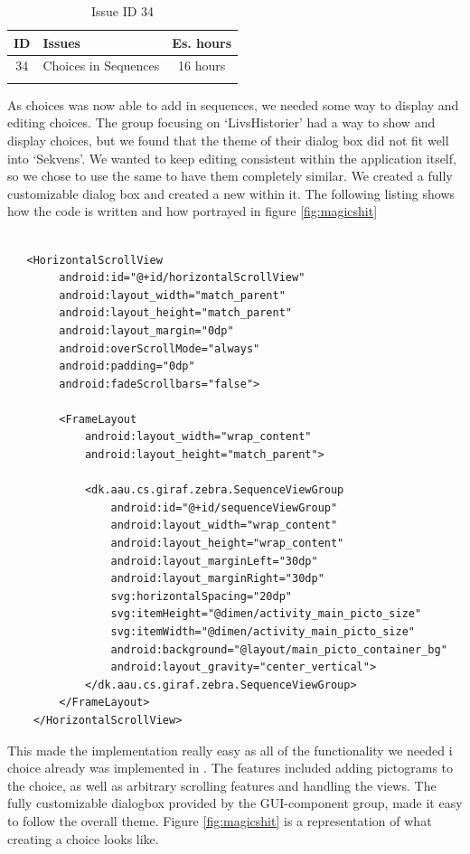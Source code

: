 \begin{longtable} { | c | p{12cm} | c | } 
\hline
	ID 	&	Issues	&		 Es. hours \\\hline
	34 	&	Choices in Sequences	&	16 hours \\\hline
\caption{Issue ID 34}
\label{tab:spr3_choicesinsequences}
\end{longtable}

As choices was now able to add in sequences, we needed some way to display and editing choices.  The group focusing on `LivsHistorier' had a way to show and display choices, but we found that the theme of their dialog box did not fit well into `Sekvens'. We wanted to keep editing consistent within the application itself, so we chose to use the same  to have them completely similar. We created a fully customizable dialog box and created a new  within it. The following listing shows how the code is written and how portrayed in figure \ref{fig:magicshit}

\begin{lstlisting}

   <HorizontalScrollView
        android:id="@+id/horizontalScrollView"
        android:layout_width="match_parent"
        android:layout_height="match_parent"
        android:layout_margin="0dp"
        android:overScrollMode="always"
        android:padding="0dp"
        android:fadeScrollbars="false">

        <FrameLayout
            android:layout_width="wrap_content"
            android:layout_height="match_parent">

            <dk.aau.cs.giraf.zebra.SequenceViewGroup
                android:id="@+id/sequenceViewGroup"
                android:layout_width="wrap_content"
                android:layout_height="wrap_content"
                android:layout_marginLeft="30dp"
                android:layout_marginRight="30dp"
                svg:horizontalSpacing="20dp"
                svg:itemHeight="@dimen/activity_main_picto_size"
                svg:itemWidth="@dimen/activity_main_picto_size"
                android:background="@layout/main_picto_container_bg"
                android:layout_gravity="center_vertical">
            </dk.aau.cs.giraf.zebra.SequenceViewGroup>
        </FrameLayout>
    </HorizontalScrollView>

\end{lstlisting}

This made the implementation really easy as all of the functionality we needed i choice already was implemented in . The features included adding pictograms to the choice, as well as arbitrary scrolling features and handling the views. The fully customizable dialogbox provided by the GUI-component group, made it easy to follow the overall theme. Figure \ref{fig:magicshit} is a representation of what creating a choice looks like.

